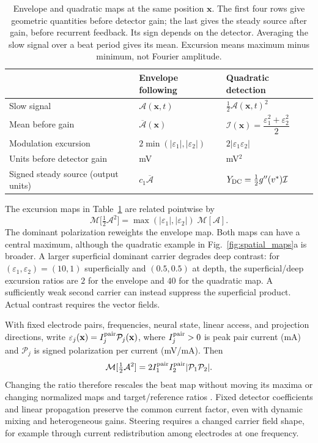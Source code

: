\documentclass[11pt,a4paper]{article}
\begin{document}
\begin{table}[ht]
\centering\small
\renewcommand{\arraystretch}{1.4}
\begin{tabular}{@{}>{\raggedright\arraybackslash}p{}
 >{\raggedright\arraybackslash}p{}
 >{\raggedright\arraybackslash}p{}@{}}
\toprule
 & Envelope following & Quadratic detection \\
\midrule
Slow signal & $\mathcal A(\mathbf x,t)$ & $\tfrac12\mathcal A(\mathbf x,t)^2$ \\
Mean before gain & $\overline{\mathcal A}(\mathbf x)$
 & $\mathcal I(\mathbf x)=\dfrac{\varepsilon_1^2+\varepsilon_2^2}{2}$ \\
Modulation excursion & $2\min(|\varepsilon_1|,|\varepsilon_2|)$
 & $2|\varepsilon_1\varepsilon_2|$ \\
Units before detector gain & mV & mV$^2$ \\
Signed steady source (output units) & $c_1\overline{\mathcal A}$
 & $Y_{\rm DC}=\tfrac12g''(v^*)\mathcal I$ \\
\bottomrule
\end{tabular}
\caption{Envelope and quadratic maps at the same position $\mathbf x$.
The first four rows give geometric quantities before detector gain; the last
gives the steady source after gain, before recurrent feedback. Its sign depends
on the detector. Averaging the slow signal over a beat period gives its mean.
Excursion means maximum minus minimum, not Fourier amplitude.}
\label{tab:transduction-maps}
\end{table}

The excursion maps in Table~\ref{tab:transduction-maps} are related pointwise by
\begin{equation}
\mathcal{M}\big[\tfrac12\mathcal A^2\big]=\max(|\varepsilon_1|,|\varepsilon_2|)\;\mathcal{M}[\mathcal A].
\label{eq:reweight}
\end{equation}
The dominant polarization reweights the envelope map. Both maps can have a
central maximum, although the quadratic example in Fig.~\ref{fig:spatial_maps}a
is broader. A larger superficial dominant carrier degrades deep contrast:
for $(\varepsilon_1,\varepsilon_2)=(10,1)$ superficially and $(0.5,0.5)$
at depth, the superficial/deep excursion ratios are $2$ for the envelope
and $40$ for the quadratic map. A sufficiently weak second carrier can
instead suppress the superficial product. Actual contrast requires the
vector fields.

With fixed electrode pairs, frequencies, neural state, linear access, and
projection directions, write
$\varepsilon_j(\mathbf x)=I_j^{\rm pair}\mathcal P_j(\mathbf x)$,
where $I_j^{\rm pair}>0$ is peak pair current (mA) and $\mathcal P_j$ is
signed polarization per current (mV/mA). Then
\[
\mathcal M[\tfrac12\mathcal A^2]
=2I_1^{\rm pair}I_2^{\rm pair}|\mathcal P_1\mathcal P_2|.
\]
Changing the ratio therefore rescales the beat map without moving its maxima
or changing normalized maps and target/reference ratios
\cite{cassara2025part2}. Fixed detector coefficients and linear propagation
preserve the common current factor, even with dynamic mixing and heterogeneous
gains. Steering requires a changed carrier field shape, for example through
current redistribution among electrodes at one frequency.
\end{document}
